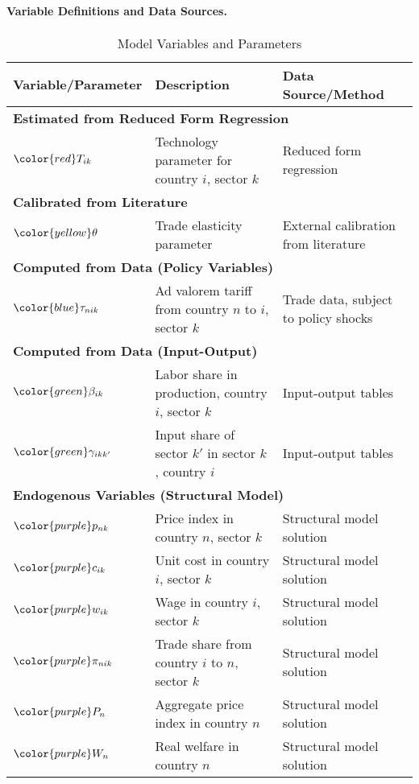 \paragraph{Variable Definitions and Data Sources.}
\begin{table}[h]
\centering
\caption{Model Variables and Parameters}
\begin{tabular}{|l|l|l|}
\hline
\textbf{Variable/Parameter} & \textbf{Description} & \textbf{Data Source/Method} \\
\hline
\multicolumn{3}{|l|}{\textbf{Estimated from Reduced Form Regression}} \\
\hline
${\color{red}T_{ik}}$ & Technology parameter for country $i$, sector $k$ & Reduced form regression \\
\hline
\multicolumn{3}{|l|}{\textbf{Calibrated from Literature}} \\
\hline
${\color{yellow}\theta}$ & Trade elasticity parameter & External calibration from literature \\
\hline
\multicolumn{3}{|l|}{\textbf{Computed from Data (Policy Variables)}} \\
\hline
${\color{blue}\tau_{nik}}$ & Ad valorem tariff from country $n$ to $i$, sector $k$ & Trade data, subject to policy shocks \\
\hline
\multicolumn{3}{|l|}{\textbf{Computed from Data (Input-Output)}} \\
\hline
${\color{green}\beta_{ik}}$ & Labor share in production, country $i$, sector $k$ & Input-output tables \\
${\color{green}\gamma_{ikk'}}$ & Input share of sector $k'$ in sector $k$, country $i$ & Input-output tables \\
\hline
\multicolumn{3}{|l|}{\textbf{Endogenous Variables (Structural Model)}} \\
\hline
${\color{purple}p_{nk}}$ & Price index in country $n$, sector $k$ & Structural model solution \\
${\color{purple}c_{ik}}$ & Unit cost in country $i$, sector $k$ & Structural model solution \\
${\color{purple}w_{ik}}$ & Wage in country $i$, sector $k$ & Structural model solution \\
${\color{purple}\pi_{nik}}$ & Trade share from country $i$ to $n$, sector $k$ & Structural model solution \\
${\color{purple}P_n}$ & Aggregate price index in country $n$ & Structural model solution \\
${\color{purple}W_n}$ & Real welfare in country $n$ & Structural model solution \\

\end{tabular}
\end{table}
